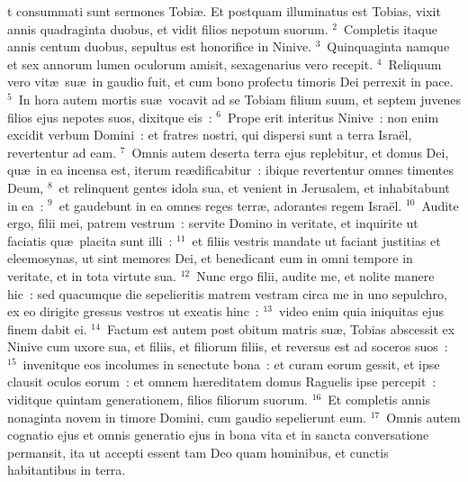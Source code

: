 \bchapter
{}t consummati sunt sermones Tobi\ae . Et postquam illuminatus est Tobias, vixit annis quadraginta duobus, et vidit filios nepotum suorum.
${}^{2}$~Completis itaque annis centum duobus, sepultus est honorifice in Ninive.
${}^{3}$~Quinquaginta namque et sex annorum lumen oculorum amisit, sexagenarius vero recepit.
${}^{4}$~Reliquum vero vit\ae\ su\ae\ in gaudio fuit, et cum bono profectu timoris Dei perrexit in pace.
${}^{5}$~In hora autem mortis su\ae\ vocavit ad se Tobiam filium suum, et septem juvenes filios ejus nepotes suos, dixitque eis~:
${}^{6}$~Prope erit interitus Ninive~: non enim excidit verbum Domini~: et fratres nostri, qui dispersi sunt a terra Isra\"el, revertentur ad eam.
${}^{7}$~Omnis autem deserta terra ejus replebitur, et domus Dei, qu\ae\ in ea incensa est, iterum re\ae dificabitur~: ibique revertentur omnes timentes Deum,
${}^{8}$~et relinquent gentes idola sua, et venient in Jerusalem, et inhabitabunt in ea~:
${}^{9}$~et gaudebunt in ea omnes reges terr\ae , adorantes regem Isra\"el.
${}^{10}$~Audite ergo, filii mei, patrem vestrum~: servite Domino in veritate, et inquirite ut faciatis qu\ae\ placita sunt illi~:
${}^{11}$~et filiis vestris mandate ut faciant justitias et eleemosynas, ut sint memores Dei, et benedicant eum in omni tempore in veritate, et in tota virtute sua.
${}^{12}$~Nunc ergo filii, audite me, et nolite manere hic~: sed quacumque die sepelieritis matrem vestram circa me in uno sepulchro, ex eo dirigite gressus vestros ut exeatis hinc~:
${}^{13}$~video enim quia iniquitas ejus finem dabit ei.
${}^{14}$~Factum est autem post obitum matris su\ae , Tobias abscessit ex Ninive cum uxore sua, et filiis, et filiorum filiis, et reversus est ad soceros suos~:
${}^{15}$~invenitque eos incolumes in senectute bona~: et curam eorum gessit, et ipse clausit oculos eorum~: et omnem h\ae reditatem domus Raguelis ipse percepit~: viditque quintam generationem, filios filiorum suorum.
${}^{16}$~Et completis annis nonaginta novem in timore Domini, cum gaudio sepelierunt eum.
${}^{17}$~Omnis autem cognatio ejus et omnis generatio ejus in bona vita et in sancta conversatione permansit, ita ut accepti essent tam Deo quam hominibus, et cunctis habitantibus in terra.
